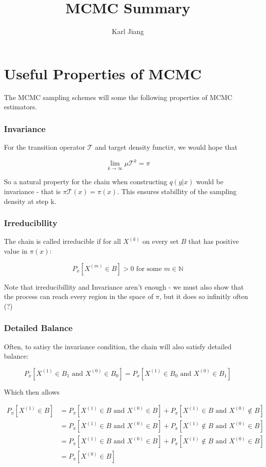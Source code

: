 \documentclass[a4paper,12pt]{article}
\title{MCMC Summary}
\author{Karl Jiang}
\begin{document}
\maketitle 


\section{Useful Properties of MCMC} 

The MCMC sampling schemes will some the following properties of MCMC estimators. 


\subsubsection{Invariance} 

For the transition operator $\mathcal{T}$ and target density functi$\pi$, we would hope that 

$$
\lim_{k \to \infty} \mu \mathcal{T}^k = \pi
$$ 

So a natural property for the chain when constructing $q(y | x)$ would be invariance - that is $\pi\mathcal{T}(x) = \pi(x)$. This ensures stabillity of the sampling density at step k. 

\subsubsection{Irreducibllity} 

The chain is called irreducible if for all $X^{(k)}$ on every set $B$ that has positive value in $\pi(x)$: 

$$
P_x[X^{(m)} \in B ] > 0 \textrm{ for some } m \in \mathbb{N}
$$

Note that irreducibillity and Invariance aren't enough - we must also show that the process can reach every region in the space of $\pi$, but it does so infinitly often (?) 

\subsubsection{Detailed Balance} 

Often, to satisy the invariance condition, the chain will also satisfy detailed balance: 

$$
P_x[X^{(1)} \in B_1 \textrm{ and } X^{(0)} \in B_0] = 
P_x[X^{(1)} \in B_0 \textrm{ and } X^{(0)} \in B_1] 
$$

Which then allows

$$
\begin{aligned} 
	P_{\pi}[X^{(1)} \in B] &= 
	P_{\pi}[X^{(1)} \in B \textrm{ and } X^{(0)} \in B ] +
	P_{\pi}[X^{(1)} \in B \textrm{ and } X^{(0)} \notin B ] \\
	&= 
	P_{\pi}[X^{(1)} \in B \textrm{ and } X^{(0)} \in B ] +
	P_{\pi}[X^{(1)} \notin B \textrm{ and } X^{(0)} \in B ] \\
	&= 
	P_{\pi}[X^{(1)} \in B \textrm{ and } X^{(0)} \in B ] +
	P_{\pi}[X^{(1)} \notin B \textrm{ and } X^{(0)} \in B ] \\
	&= 
	P_{\pi}[X^{(0)} \in B] 
\end{aligned} 
$$
\end{document}
